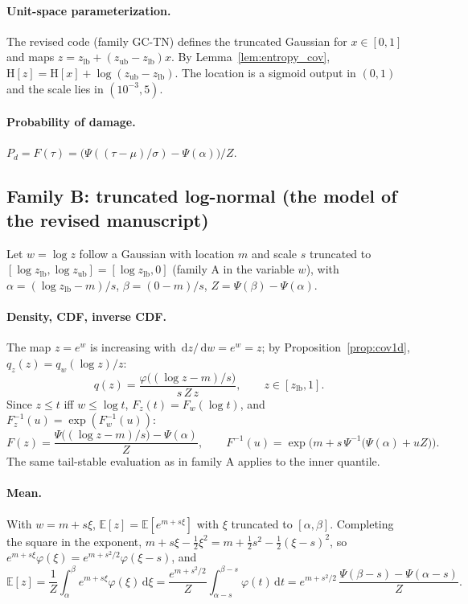 \documentclass[11pt,a4paper]{article}
\numberwithin{equation}{section}
\theoremstyle{plain}
\theoremstyle{definition}
\theoremstyle{remark}
\newcommand{\E}{\mathbb{E}}
\newcommand{\Hent}{\mathrm{H}}
\newcommand{\dd}{\,\mathrm{d}}
\newcommand{\zlb}{z_{\text{lb}}}
\newcommand{\zub}{z_{\text{ub}}}
\begin{document}
\paragraph{Unit-space parameterization.} The revised code (family GC-TN) defines the truncated Gaussian for $x\in[0,1]$ and maps $z=\zlb+(\zub-\zlb)x$. By Lemma~\ref{lem:entropy_cov}, $\Hent[z]=\Hent[x]+\log(\zub-\zlb)$. The location is a sigmoid output in $(0,1)$ and the scale lies in $(10^{-3},5)$.

\paragraph{Probability of damage.} $P_d=F(\tau)=\big(\Psi((\tau-\mu)/\sigma)-\Psi(\alpha)\big)/Z$.

\subsection{Family B: truncated log-normal (the model of the revised manuscript)}
\label{sec:logn}
Let $w=\log z$ follow a Gaussian with location $m$ and scale $s$ truncated to $[\log\zlb,\log\zub]=[\log\zlb,0]$ (family A in the variable $w$), with $\alpha=(\log\zlb-m)/s$, $\beta=(0-m)/s$, $Z=\Psi(\beta)-\Psi(\alpha)$.

\paragraph{Density, CDF, inverse CDF.} The map $z=e^w$ is increasing with $\dd z/\dd w=e^w=z$; by Proposition~\ref{prop:cov1d}, $q_z(z)=q_w(\log z)/z$:
\begin{equation}
q(z)=\frac{\varphi\big((\log z-m)/s\big)}{s\,Z\,z},\qquad z\in[\zlb,1].
\end{equation}
Since $z\le t$ iff $w\le\log t$, $F_z(t)=F_w(\log t)$, and $F_z^{-1}(u)=\exp(F_w^{-1}(u))$:
\begin{equation}
F(z)=\frac{\Psi\big((\log z-m)/s\big)-\Psi(\alpha)}{Z},\qquad
F^{-1}(u)=\exp\Big(m+s\,\Psi^{-1}\big(\Psi(\alpha)+uZ\big)\Big).
\end{equation}
The same tail-stable evaluation as in family A applies to the inner quantile.

\paragraph{Mean.} With $w=m+s\xi$, $\E[z]=\E[e^{m+s\xi}]$ with $\xi$ truncated to $[\alpha,\beta]$. Completing the square in the exponent, $m+s\xi-\tfrac12\xi^2=m+\tfrac12s^2-\tfrac12(\xi-s)^2$, so $e^{m+s\xi}\varphi(\xi)=e^{m+s^2/2}\varphi(\xi-s)$, and
\begin{equation}
\E[z]=\frac1Z\int_\alpha^\beta e^{m+s\xi}\varphi(\xi)\dd\xi=\frac{e^{m+s^2/2}}{Z}\int_{\alpha-s}^{\beta-s}\varphi(t)\dd t=e^{m+s^2/2}\,\frac{\Psi(\beta-s)-\Psi(\alpha-s)}{Z}.
\end{equation}
\end{document}
